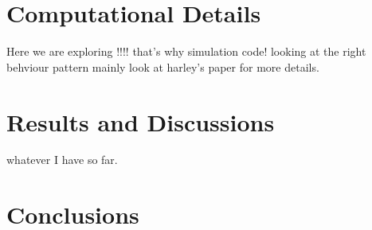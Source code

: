 \section{Computational Details}
Here we are exploring !!!! that's why simulation code!
looking at the right behviour pattern mainly
look at harley's paper for more details.
\section{Results and Discussions}
whatever I have so far.
\section{Conclusions}


